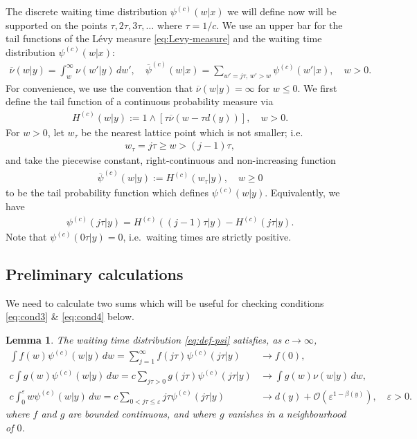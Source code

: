 \documentclass[a4paper,12pt]{elsarticle}
\numberwithin{equation}{section}
\theoremstyle{plain}
\newtheorem{lemma}[theorem]{Lemma}
\theoremstyle{definition}
\theoremstyle{remark}
\numberwithin{equation}{section}
\newcommand{\1}{\mathbf 1}
\begin{document}
The discrete waiting time distribution $\psi^{(c)}(w|x)$ we will define now will be supported on the points $\tau, 2\tau, 3\tau, \ldots$ where $\tau = 1/c$. 
We use an upper bar for the tail functions of the L\'evy measure 
\eqref{eq:Levy-measure} and the waiting time distribution $\psi^{(c)}(w|x)$: 
\begin{align}
  \overline \nu(w|y) = \int_w^\infty \nu(w'|y)\,dw', 
  \quad 
  \overline \psi^{(c)}(w|x) = \sum_{w' = j\tau,\, w' > w} \psi^{(c)}(w'|x), 
  \quad w > 0.
\end{align}
For convenience, we use the convention that $\overline \nu(w|y) = \infty$ for $w \le 0$.  We first define the tail function of a continuous probability measure via 
\begin{align}
  H^{(c)}(w | y) := 1 \wedge \left[\tau \overline \nu\left(w - \tau d(y)\right)\right], \quad w > 0.
\end{align}
For $w>0$, let $w_\tau$ be the nearest lattice point which is not smaller; i.e.\
\begin{align} \label{eq:w-tau}
w_\tau = j\tau \ge w > (j-1)\tau, 
\end{align}
and take the piecewise constant, 
right-continuous and non-increasing function 
\begin{align}
  \overline\psi^{(c)}(w|y) := H^{(c)}(w_\tau|y), \quad w \ge 0
\end{align}
to be the tail probability function which defines $\psi^{(c)}(w|y)$. 
Equivalently, we have 
\begin{align} \label{eq:def-psi}
  \psi^{(c)}(j\tau | y) = H^{(c)}((j-1)\tau | y) - H^{(c)}(j\tau | y). 
\end{align}
Note that $\psi^{(c)}(0\tau | y) = 0$, i.e.\ waiting times are strictly positive.


\subsection{Preliminary calculations}

We need to calculate two sums which will be useful for checking conditions 
\eqref{eq:cond3} \& \eqref{eq:cond4} below. 

\begin{lemma}
The waiting time distribution \eqref{eq:def-psi} satisfies, as $c \to \infty$, 
\begin{align} 
\label{eq:psi2delta}
\int f(w) \psi^{(c)}(w|y)\,dw = \sum_{j = 1}^\infty f(j\tau) \psi^{(c)}(j\tau|y)
&\to f(0),
\\ \label{eq:psi-non-local}
c \int g(w) \psi^{(c)}(w|y)\,dw
= c \sum\limits_{j\tau > 0} g(j\tau) \psi^{(c)}(j\tau|y) 
&\to \int g(w) \nu(w|y)\,dw,
\\ \label{eq:psi-local}
c \int_0^\varepsilon w \psi^{(c)}(w|y)\,dw 
= c \sum\limits_{0 < j\tau \le \varepsilon} j\tau \psi^{(c)}(j\tau | y)
&\to d(y) 
+ \mathcal O(\varepsilon^{1-\beta(y)}), \quad \varepsilon > 0.
\end{align}
where $f$ and $g$ are bounded continuous, and where $g$ vanishes in a neighbourhood of $0$. 
\end{lemma}
\end{document}
